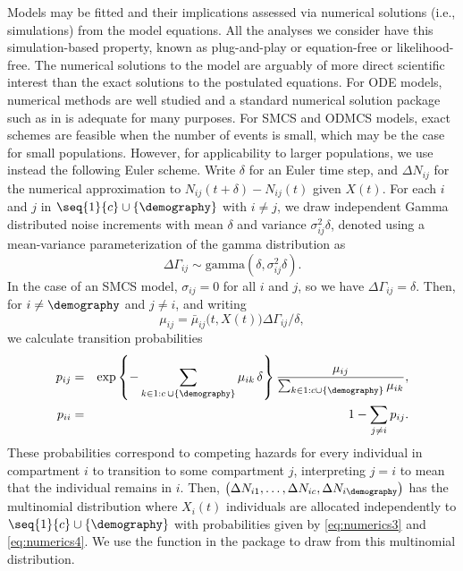 Models may be fitted and their implications assessed via numerical solutions (i.e., simulations) from the model equations.
All the analyses we consider have this simulation-based property, known as plug-and-play or equation-free or likelihood-free.
The numerical solutions to the model are arguably of more direct scientific interest than the exact solutions to the postulated equations.
For ODE models, numerical methods are well studied and a standard numerical solution package such as  in  is adequate for many purposes.
For SMCS and ODMCS models, exact schemes are feasible when the number of events is small, which may be the case for small populations.
However, for applicability to larger populations, we use instead the following Euler scheme.
Write $\delta$ for an Euler time step, and $\Delta N_{ij}$ for the numerical approximation to $N_{ij}(t+\delta)-N_{ij}(t)$ given $X(t)$.
For each $i$ and $j$ in $\seq{1}{c} \cup \{\demography\}$ with $i \neq j$, we draw independent Gamma distributed noise increments with mean $\delta$ and variance $\sigma_{ij}^2 \delta$, denoted using a mean-variance parameterization of the gamma distribution as
\begin{equation}
\label{eq:numerics1}
\Delta\Gamma_{ij} \sim \mathrm{gamma}(\delta, \sigma_{ij}^2 \delta).
\end{equation}
In the case of an SMCS model, $\sigma_{ij}=0$ for all $i$ and $j$, so we have $\Delta\Gamma_{ij}=\delta$.
Then, for $i\neq \demography$ and $j\neq i$, and writing
\begin{equation}
\label{eq:numerics2}
\mu_{ij}=\bar\mu_{ij}\big(t,X(t)\big) \Delta\Gamma_{ij} / \delta,
\end{equation}
we calculate transition probabilities
\begin{eqnarray}
\label{eq:numerics3}
p_{ij} &=& \exp\left\{-\sum_{k\in 1:c \, \cup \{\demography\}} \mu_{ik} \, \delta \right\}
\frac{\mu_{ij}}{\sum_{k\in 1:c\cup \{\demography\}} \mu_{ik}},
\\
\label{eq:numerics4}
p_{ii} &=& 1 - \sum_{j\neq i} p_{ij}.
\end{eqnarray}
These probabilities correspond to competing hazards for every individual in compartment $i$ to transition to some compartment $j$, interpreting $j=i$ to mean that the individual remains in $i$.
Then, $\big(\Delta N_{i1},\dots,\Delta N_{ic},\Delta N_{i\demography}\big)$ has the multinomial distribution where $X_i(t)$ individuals are allocated independently to $\seq{1}{c}\cup\{\demography\}$ with probabilities given by \eqref{eq:numerics3} and \eqref{eq:numerics4}.
We use the  function in the  package to draw from this multinomial distribution.

